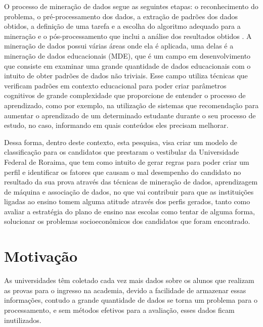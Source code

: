 \par
 O processo de mineração de dados segue as seguintes etapas: o reconhecimento do problema, o pré-processamento dos dados, a extração de padrões dos dados obtidos, a definição de uma tarefa e a escolha do algoritmo adequado para a mineração e o pós-processamento que inclui a análise dos resultados obtidos \cite{Stulp2014}. A mineração de dados possui várias áreas onde ela é aplicada, uma delas é a mineração de dados educacionais (MDE), que é um campo em desenvolvimento que consiste em examinar uma grande quantidade de dados educacionais com o intuito de obter padrões de dados não triviais. Esse campo utiliza técnicas que verificam padrões em contexto educacional para poder criar parâmetros cognitivos de grande complexidade que proporcione de entender o processo de aprendizado, como por exemplo, na utilização de sistemas que recomendação para aumentar o aprendizado de um determinado estudante durante o seu processo de estudo, no caso, informando em quais conteúdos eles precisam melhorar\cite{Cazella2012}.

\par
Dessa forma, dentro deste contexto, esta pesquisa, visa criar um modelo de classificação para os candidatos que prestaram o vestibular da Universidade Federal de Roraima,  que tem como intuito de gerar regras para poder criar um perfil e identificar os fatores que causam o mal desempenho do candidato no resultado da sua prova através das técnicas de mineração de dados, aprendizagem de máquina e associação de dados, no que vai contribuir para que as instituições ligadas ao ensino tomem alguma atitude através dos perfis gerados, tanto como avaliar a estratégia do plano de ensino nas escolas como tentar de alguma forma, solucionar os problemas socioeconômicos dos candidatos que foram encontrado.







\section{Motivação}

As universidades têm coletado cada vez mais dados sobre os alunos que realizam as provas para o ingresso na academia, devido a facilidade de armazenar essas informações, contudo a grande quantidade de dados se torna um problema para o processamento, e sem métodos efetivos para a avaliação, esses dados ficam inutilizados.

